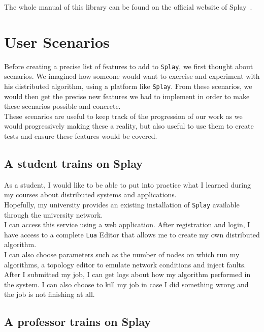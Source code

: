 \documentclass{eplmastersthesis}
\begin{document}
          The whole manual of this library can be found on the official
          website of Splay~\cite{SplayLib}.


    \section{User Scenarios}

      Before creating a precise list of features to add to \texttt{Splay}, we first
      thought about scenarios. We imagined how someone would want to exercise
      and experiment with his distributed algorithm, using a platform like
      \texttt{Splay}. From these scenarios, we would then get the precise new features
      we had to implement in order to make these scenarios possible and
      concrete.\\

      These scenarios are useful to keep track of the progression of our
      work as we would progressively making these a reality, but also useful
      to use them to create tests and ensure these features would be covered.

      \subsection{A student trains on Splay}

        As a student, I would like to be able to put into practice what I learned
        during my courses about distributed systems and applications.\\
        Hopefully, my university provides an existing installation of \texttt{Splay}
        available through the university network.\\
        I can access this service using a web application. After
        registration and login, I have access to a complete \texttt{Lua} Editor that
        allows me to create my own distributed algorithm.\\
        I can also choose parameters such as the number of nodes on
        which run my algorithms, a topology editor to emulate network
        conditions and inject faults.\\
        After I submitted my job, I can get logs about how my algorithm
        performed in the system. I can also choose to kill my job in case
        I did something wrong and the job is not finishing at all.

      \subsection{A professor trains on Splay}
\end{document}
